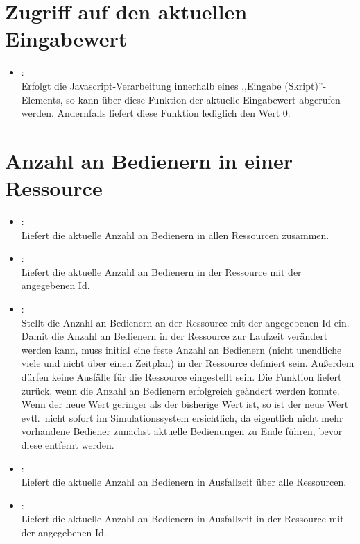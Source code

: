 \section{Zugriff auf den aktuellen Eingabewert}

\begin{itemize}

\item
{}:\\
Erfolgt die Javascript-Verarbeitung innerhalb eines ,,Eingabe (Skript)''-Elements,
so kann über diese Funktion der aktuelle Eingabewert abgerufen werden. Andernfalls liefert diese Funktion lediglich den Wert 0. 

\end{itemize}

\section{Anzahl an Bedienern in einer Ressource}

\begin{itemize}

\item
{}:\\
Liefert die aktuelle Anzahl an Bedienern in allen Ressourcen zusammen.
  
\item
{}:\\
Liefert die aktuelle Anzahl an Bedienern in der Ressource mit der angegebenen Id.
  
\item
{}:\\
Stellt die Anzahl an Bedienern an der Ressource mit der angegebenen Id ein.
Damit die Anzahl an Bedienern in der Ressource zur Laufzeit verändert werden kann,
muss initial eine feste Anzahl an Bedienern (nicht unendliche viele und nicht über einen Zeitplan)
in der Ressource definiert sein. Außerdem dürfen keine Ausfälle für die Ressource eingestellt sein.
Die Funktion liefert  zurück, wenn die Anzahl an Bedienern erfolgreich geändert
werden konnte. Wenn der neue Wert geringer als der bisherige Wert ist, so ist der neue Wert
evtl.\ nicht sofort im Simulationssystem ersichtlich, da eigentlich nicht mehr vorhandene Bediener
zunächst aktuelle Bedienungen zu Ende führen, bevor diese entfernt werden. 

\item
{}:\\
Liefert die aktuelle Anzahl an Bedienern in Ausfallzeit über alle Ressourcen.

\item
{}:\\
Liefert die aktuelle Anzahl an Bedienern in Ausfallzeit in der Ressource mit der angegebenen Id.

\end{itemize}

